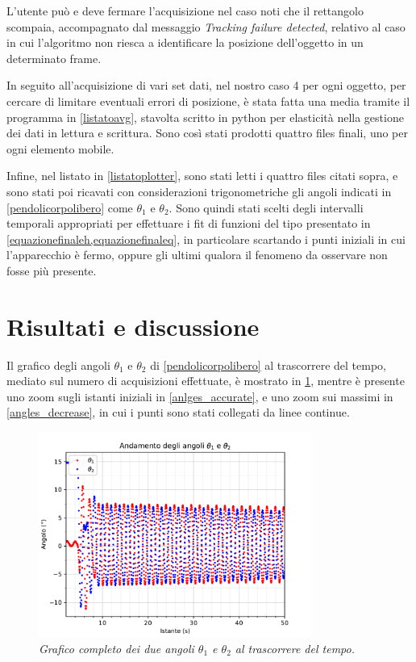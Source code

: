 \documentclass[11pt, a4paper, twoside, italian]{article}
\begin{document}
L'utente può e deve fermare l'acquisizione nel caso noti che il rettangolo
scompaia, accompagnato dal messaggio \textit{Tracking failure detected}, relativo al
caso in cui l'algoritmo non riesca a identificare la posizione dell'oggetto
in un determinato frame.

In seguito all'acquisizione di vari set dati, nel nostro caso 4 per ogni oggetto,
per cercare di limitare eventuali errori di posizione, è stata fatta 
una media tramite il programma in \cref{listatoavg}, stavolta scritto
in python per elasticità nella gestione dei dati in lettura e scrittura.
Sono così stati prodotti quattro files finali, uno per ogni elemento mobile.

Infine, nel listato in \cref{listatoplotter}, sono stati letti i quattro
files citati sopra, e sono stati poi ricavati con considerazioni
trigonometriche gli angoli indicati in \cref{pendolicorpolibero} come
$\theta_1$ e $\theta_2$. Sono quindi stati scelti degli intervalli 
temporali appropriati per effettuare i fit di funzioni del tipo presentato in 
\cref{equazionefinaleh,equazionefinaleq}, in particolare scartando 
i punti iniziali in cui l'apparecchio è fermo, oppure gli ultimi 
qualora il fenomeno da osservare non fosse più presente.

\section{Risultati e discussione}
Il grafico degli angoli $\theta_1$ e $\theta_2$ di \cref{pendolicorpolibero} 
al trascorrere del tempo, mediato sul 
numero di acquisizioni effettuate, è mostrato in
\cref{angles_full}, mentre è presente uno zoom sugli istanti iniziali in \cref{anlges_accurate},
e uno zoom sui massimi in \cref{angles_decrease}, in cui i punti sono stati collegati 
da linee continue.

\begin{figure}[h!]
  \centering
  \includegraphics[width=0.8\textwidth]{../../media/plot/angles_full.pdf}
  \caption{\textit{Grafico completo dei due angoli $\theta_1$ e $\theta_2$ al trascorrere del tempo.} }
  \label{angles_full}
\end{figure}
\end{document}
